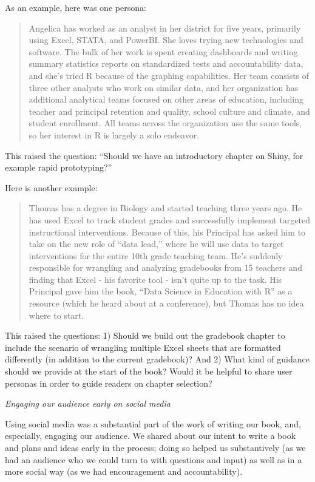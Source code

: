 \documentclass[
  english,
  man]{apa6}
\begin{document}
As an example, here was one persona:

\begin{quote}
Angelica has worked as an analyst in her district for five years, primarily using Excel, STATA, and PowerBI. She loves trying new technologies and software. The bulk of her work is spent creating dashboards and writing summary statistics reports on standardized tests and accountability data, and she's tried R because of the graphing capabilities. Her team consists of three other analysts who work on similar data, and her organization has additional analytical teams focused on other areas of education, including teacher and principal retention and quality, school culture and climate, and student enrollment. All teams across the organization use the same tools, so her interest in R is largely a solo endeavor.
\end{quote}

This raised the question: ``Should we have an introductory chapter on Shiny, for example rapid prototyping?''

Here is another example:

\begin{quote}
Thomas has a degree in Biology and started teaching three years ago. He has used Excel to track student grades and successfully implement targeted instructional interventions. Because of this, his Principal has asked him to take on the new role of ``data lead,'' where he will use data to target interventions for the entire 10th grade teaching team. He's suddenly responsible for wrangling and analyzing gradebooks from 15 teachers and finding that Excel - his favorite tool - isn't quite up to the task. His Principal gave him the book, ``Data Science in Education with R'' as a resource (which he heard about at a conference), but Thomas has no idea where to start.
\end{quote}

This raised the questions: 1) Should we build out the gradebook chapter to include the scenario of wrangling multiple Excel sheets that are formatted differently (in addition to the current gradebook)? And 2) What kind of guidance should we provide at the start of the book? Would it be helpful to share user personas in order to guide readers on chapter selection?

\emph{Engaging our audience early on social media}

Using social media was a substantial part of the work of writing our book, and, especially, engaging our audience. We shared about our intent to write a book and plans and ideas early in the process; doing so helped us substantively (as we had an audience who we could turn to with questions and input) as well as in a more social way (as we had encouragement and accountability).
\end{document}
